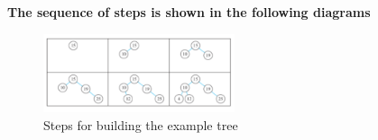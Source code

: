 \documentclass{report}
\begin{document}
{\centerline{{\large{\textbf{The sequence of steps is shown in the following diagrams}}}}}
\begin{figure}[ht]
\centering
\includegraphics[width=0.5\textwidth]{ tree6.png }
\caption{Steps for building the example tree}
\end{figure}
\bigbreak \noindent \bigbreak \noindent
{}
\end{document}
